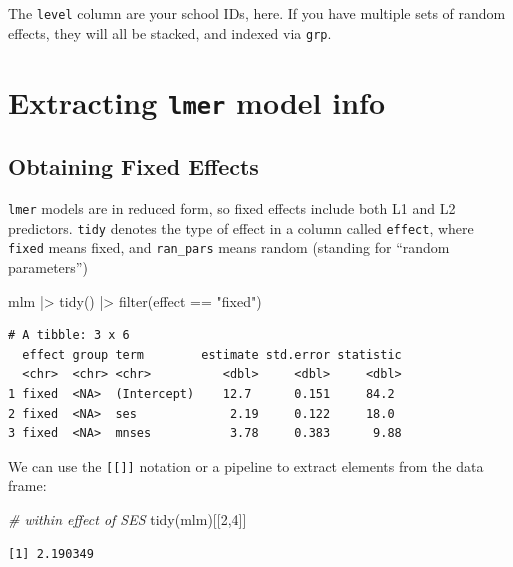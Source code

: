 \documentclass[
  letterpaper,
  DIV=11,
  numbers=noendperiod]{scrreprt}
\newenvironment{Shaded}{}{}
\newcommand{\CommentTok}[1]{\textcolor[rgb]{0.38,0.63,0.69}{\textit{#1}}}
\newcommand{\DecValTok}[1]{\textcolor[rgb]{0.25,0.63,0.44}{#1}}
\newcommand{\FunctionTok}[1]{\textcolor[rgb]{0.02,0.16,0.49}{#1}}
\newcommand{\NormalTok}[1]{#1}
\newcommand{\SpecialCharTok}[1]{\textcolor[rgb]{0.25,0.44,0.63}{#1}}
\newcommand{\StringTok}[1]{\textcolor[rgb]{0.25,0.44,0.63}{#1}}
\begin{document}
The \texttt{level} column are your school IDs, here. If you have
multiple sets of random effects, they will all be stacked, and indexed
via \texttt{grp}.

\section{\texorpdfstring{Extracting \texttt{lmer} model
info}{Extracting lmer model info}}\label{extracting-lmer-model-info}

\subsection{Obtaining Fixed Effects}\label{obtaining-fixed-effects}

\texttt{lmer} models are in reduced form, so fixed effects include both
L1 and L2 predictors. \texttt{tidy} denotes the type of effect in a
column called \texttt{effect}, where \texttt{fixed} means fixed, and
\texttt{ran\_pars} means random (standing for ``random parameters'')

\begin{Shaded}
\begin{Highlighting}[]
\NormalTok{mlm }\SpecialCharTok{|\textgreater{}} 
  \FunctionTok{tidy}\NormalTok{() }\SpecialCharTok{|\textgreater{}} 
  \FunctionTok{filter}\NormalTok{(effect }\SpecialCharTok{==} \StringTok{"fixed"}\NormalTok{)}
\end{Highlighting}
\end{Shaded}

\begin{verbatim}
# A tibble: 3 x 6
  effect group term        estimate std.error statistic
  <chr>  <chr> <chr>          <dbl>     <dbl>     <dbl>
1 fixed  <NA>  (Intercept)    12.7      0.151     84.2 
2 fixed  <NA>  ses             2.19     0.122     18.0 
3 fixed  <NA>  mnses           3.78     0.383      9.88
\end{verbatim}

We can use the \texttt{{[}{[}{]}{]}} notation or a pipeline to extract
elements from the data frame:

\begin{Shaded}
\begin{Highlighting}[]
\CommentTok{\# within effect of SES}
\FunctionTok{tidy}\NormalTok{(mlm)[[}\DecValTok{2}\NormalTok{,}\DecValTok{4}\NormalTok{]]}
\end{Highlighting}
\end{Shaded}

\begin{verbatim}
[1] 2.190349
\end{verbatim}
\end{document}
